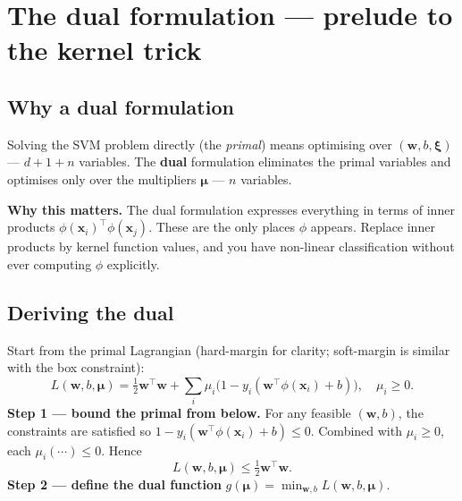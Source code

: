 \documentclass[11pt, a4paper]{article}
\begin{document}
\section{The dual formulation --- prelude to the kernel trick}

\subsection{Why a dual formulation}

Solving the SVM problem directly (the \emph{primal}) means optimising over $(\mathbf{w}, b, \boldsymbol\xi)$ — $d + 1 + n$ variables. The \textbf{dual} formulation eliminates the primal variables and optimises only over the multipliers $\boldsymbol\mu$ — $n$ variables.

\textbf{Why this matters.} The dual formulation expresses everything in terms of inner products $\phi(\mathbf{x}_i)^\top\phi(\mathbf{x}_j)$. These are the only places $\phi$ appears. Replace inner products by kernel function values, and you have non-linear classification without ever computing $\phi$ explicitly.

\subsection{Deriving the dual}

Start from the primal Lagrangian (hard-margin for clarity; soft-margin is similar with the box constraint):
\[
L(\mathbf{w}, b, \boldsymbol\mu) = \tfrac{1}{2}\mathbf{w}^\top\mathbf{w} + \sum_i \mu_i\big(1 - y_i(\mathbf{w}^\top\phi(\mathbf{x}_i) + b)\big), \quad \mu_i \ge 0.
\]
\textbf{Step 1 — bound the primal from below.} For any feasible $(\mathbf{w}, b)$, the constraints are satisfied so $1 - y_i(\mathbf{w}^\top\phi(\mathbf{x}_i) + b) \le 0$. Combined with $\mu_i \ge 0$, each $\mu_i(\cdots) \le 0$. Hence
\[
L(\mathbf{w}, b, \boldsymbol\mu) \le \tfrac{1}{2}\mathbf{w}^\top\mathbf{w}.
\]
\textbf{Step 2 — define the dual function} $g(\boldsymbol\mu) = \min_{\mathbf{w}, b} L(\mathbf{w}, b, \boldsymbol\mu)$.
\end{document}

